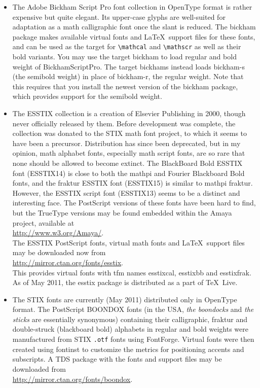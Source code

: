 \documentclass[11pt]{amsart}
\begin{document}
\begin{itemize}
\item The Adobe Bickham Script Pro font collection in OpenType format is rather expensive but quite elegant. Its upper-case glyphs are well-suited for adaptation as a math calligraphic font once the slant is reduced. The \textsf{bickham} package makes available virtual fonts and \LaTeX\ support files for these fonts, and can be used as the target for \verb|\mathcal| and \verb|\mathscr| as well as their bold variants. You may use the target \textsf{bickham} to load regular and bold weight of BickhamScriptPro. The target \textsf{bickhams} instead loads \textsf{bickham-s} (the semibold weight) in place of \textsf{bickham-r}, the regular weight. Note that this requires that you install the newest version of the \textsf{bickham} package, which provides support for the semibold weight.
\item The ESSTIX collection is a creation of Elsevier Publishing in 2000, though never officially released by them. Before development was complete, the collection was donated to the STIX math font project, to which it seems to have been a precursor. Distribution has since been deprecated, but in my opinion, math alphabet fonts, especially math script fonts,  are so rare that none should be allowed to become extinct. The BlackBoard Bold ESSTIX font (\textsf{ESSTIX14}) is  close to both the mathpi and Fourier Blackboard Bold fonts, and the fraktur ESSTIX font (\textsf{ESSTIX15}) is  similar to mathpi fraktur. However, the ESSTIX script font (\textsf{ESSTIX13}) seems to be a distinct and interesting face. The PostScript versions of these fonts have been  hard to find, but the TrueType versions may be found embedded within the \textsf{Amaya} project, available at\\
\url{http://www.w3.org/Amaya/}.\\
    The ESSTIX PostScript fonts, virtual math fonts  and \LaTeX\ support files may be downloaded now from\\
\url{http://mirror.ctan.org/fonts/esstix}.\\
This provides virtual fonts with tfm names \textsf{esstixcal}, \textsf{esstixbb} and \textsf{esstixfrak}. As of May 2011, the \textsf{esstix} package is distributed as a part of \TeX\ Live. 
\item The STIX fonts are currently (May 2011) distributed only in OpenType format. The PostScript BOONDOX fonts (in the USA, \emph{the boondocks} and \emph{the sticks} are essentially synonymous) containing their  calligraphic, fraktur and double-struck (blackboard bold) alphabets in regular and bold weights were manufactured from STIX {\tt.otf} fonts using \textsf{FontForge}. Virtual fonts were then created using \textsf{fontinst} to customize the metrics for positioning accents and subscripts.  A TDS package with the fonts and support files may be downloaded  from\\
\url{http://mirror.ctan.org/fonts/boondox}.\\
\end{itemize}
\end{document}
